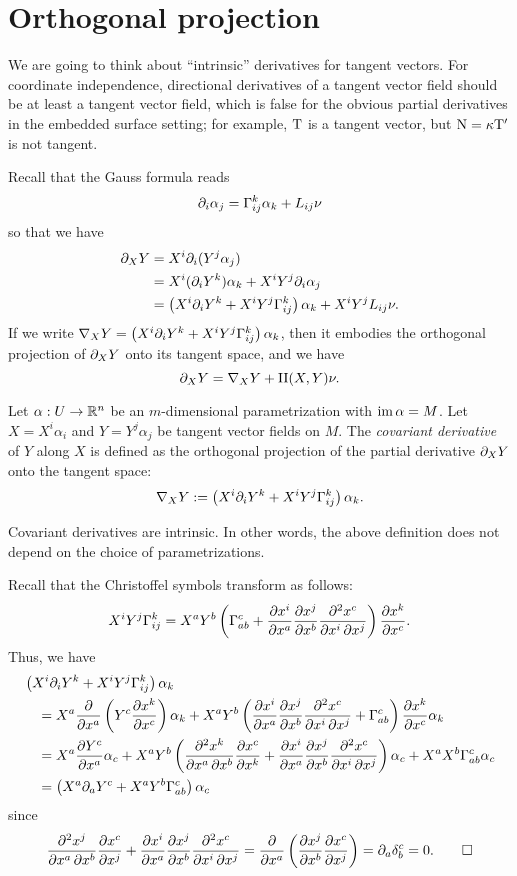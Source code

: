 \documentclass{../note}
\def\a{\alpha}
\def\II{\mathrm{II}}
\begin{document}
\section{Orthogonal projection}
We are going to think about ``intrinsic'' derivatives for tangent vectors.
For coordinate independence, directional derivatives of a tangent vector field should be at least a tangent vector field, which is false for the obvious partial derivatives in the embedded surface setting; for example, $\mathrm{T}$ is a tangent vector, but $\mathrm{N}=\kappa\mathrm{T}'$ is not tangent.

Recall that the Gauss formula reads
\[\pd_i\a_j=\Gamma_{ij}^k\a_k+L_{ij}\nu\]
so that we have
\begin{align*}
\pd_XY
&=X^i\pd_i(Y^j\a_j)\\
&=X^i(\pd_iY^k)\a_k+X^iY^j\pd_i\a_j\\
&=\left(X^i\pd_iY^k+X^iY^j\Gamma_{ij}^k\right)\a_k+X^iY^jL_{ij}\nu.
\end{align*}
If we write $\nabla_XY=\left(X^i\pd_iY^k+X^iY^j\Gamma_{ij}^k\right)\a_k$, then it embodies the orthogonal projection of $\pd_XY$ onto its tangent space, and we have
\[\pd_XY=\nabla_XY+\II(X,Y)\nu.\]

\begin{defn}
Let $\a:U\to\R^n$ be an $m$-dimensional parametrization with $\im\a=M$.
Let $X=X^i\a_i$ and $Y=Y^j\a_j$ be tangent vector fields on $M$.
The \emph{covariant derivative} of $Y$ along $X$ is defined as the orthogonal projection of the partial derivative $\pd_XY$ onto the tangent space:
\[\nabla_XY:=\left(X^i\pd_iY^k+X^iY^j\Gamma_{ij}^k\right)\a_k.\]
\end{defn}

\begin{prop}
Covariant derivatives are intrinsic.
In other words, the above definition does not depend on the choice of parametrizations.
\end{prop}
\begin{pf}
Recall that the Christoffel symbols transform as follows:
\[X^iY^j\Gamma_{ij}^k=X^aY^b\left(\Gamma_{ab}^c+\pd{x^i}{x^a}\pd{x^j}{x^b}\pd[2]{x^c}{x^i}{x^j}\right)\pd{x^k}{x^c}.\]
Thus, we have
\begin{align*}
&\left(X^i\pd_iY^k+X^iY^j\Gamma_{ij}^k\right)\a_k\\
&\quad=X^a\pd{x^a}\left(Y^c\pd{x^k}{x^c}\right)\a_k+X^aY^b\left(\pd{x^i}{x^a}\pd{x^j}{x^b}\pd[2]{x^c}{x^i}{x^j}+\Gamma_{ab}^c\right)\pd{x^k}{x^c}\a_k\\
&\quad=X^a\pd{Y^c}{x^a}\a_c+X^aY^b\left(\pd[2]{x^k}{x^a}{x^b}\pd{x^c}{x^k}+\pd{x^i}{x^a}\pd{x^j}{x^b}\pd[2]{x^c}{x^i}{x^j}\right)\a_c+X^aX^b\Gamma_{ab}^c\a_c\\
&\quad=\left(X^a\pd_aY^c+X^aY^b\Gamma_{ab}^c\right)\a_c
\end{align*}
since
\[\pd[2]{x^j}{x^a}{x^b}\pd{x^c}{x^j}+\pd{x^i}{x^a}\pd{x^j}{x^b}\pd[2]{x^c}{x^i}{x^j}=\pd{x^a}\left(\pd{x^j}{x^b}\pd{x^c}{x^j}\right)=\pd_a\delta_b^c=0.\qedhere\]
\end{pf}
\end{document}
